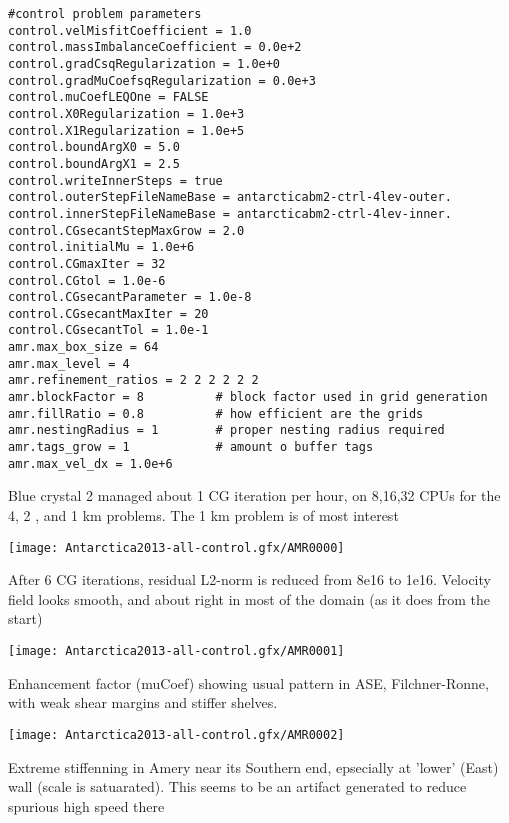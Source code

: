 \documentclass{article}
\begin{document}
\begin{verbatim}
#control problem parameters
control.velMisfitCoefficient = 1.0
control.massImbalanceCoefficient = 0.0e+2
control.gradCsqRegularization = 1.0e+0
control.gradMuCoefsqRegularization = 0.0e+3
control.muCoefLEQOne = FALSE
control.X0Regularization = 1.0e+3
control.X1Regularization = 1.0e+5
control.boundArgX0 = 5.0
control.boundArgX1 = 2.5
control.writeInnerSteps = true
control.outerStepFileNameBase = antarcticabm2-ctrl-4lev-outer.
control.innerStepFileNameBase = antarcticabm2-ctrl-4lev-inner.
control.CGsecantStepMaxGrow = 2.0
control.initialMu = 1.0e+6
control.CGmaxIter = 32
control.CGtol = 1.0e-6
control.CGsecantParameter = 1.0e-8
control.CGsecantMaxIter = 20
control.CGsecantTol = 1.0e-1
amr.max_box_size = 64
amr.max_level = 4
amr.refinement_ratios = 2 2 2 2 2 2 
amr.blockFactor = 8          # block factor used in grid generation
amr.fillRatio = 0.8          # how efficient are the grids
amr.nestingRadius = 1        # proper nesting radius required
amr.tags_grow = 1            # amount o buffer tags
amr.max_vel_dx = 1.0e+6
\end{verbatim}

Blue crystal 2 managed about 1 CG iteration per hour, on 8,16,32 CPUs for the 
4, 2 , and 1 km problems. The 1 km problem is of most interest

\begin{center}
\texttt{[image: Antarctica2013-all-control.gfx/AMR0000]}
\end{center}

After 6 CG iterations, residual L2-norm is reduced from 8e16 to 1e16. 
Velocity field looks smooth, and about right in most of the domain (as it does from the start)

\begin{center}
\texttt{[image: Antarctica2013-all-control.gfx/AMR0001]}
\end{center}

Enhancement factor (muCoef) showing usual pattern in ASE, Filchner-Ronne, with
weak shear margins and stiffer shelves. 

\begin{center}
\texttt{[image: Antarctica2013-all-control.gfx/AMR0002]}
\end{center}

Extreme stiffenning in Amery near its Southern end, epsecially at 'lower' (East) wall (scale
is satuarated). This seems to be an artifact generated to reduce spurious high speed there
\end{document}
